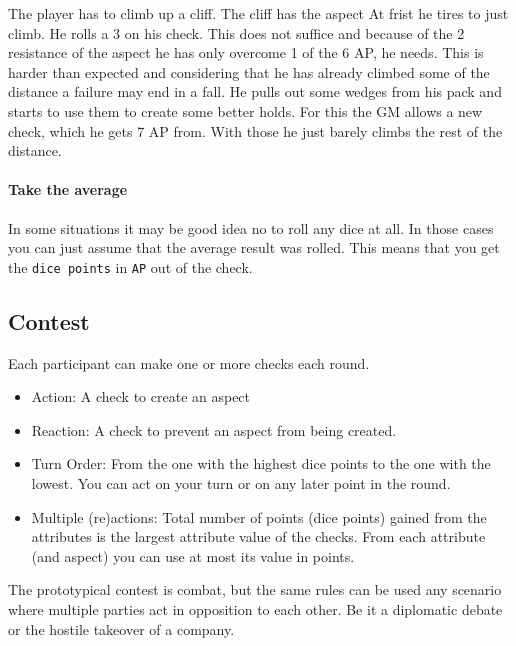 \documentclass[11pt]{article}
\begin{document}
{\begin{pwexample}
The player has to climb up a cliff. The cliff has the aspect  At frist he tires to just climb. He rolls a 3 on his check. This does not suffice and because of the 2 resistance of the aspect he has only overcome 1 of the 6 AP, he needs. This is harder than expected and considering that he has already climbed some of the distance a failure may end in a fall. He pulls out some wedges from his pack and starts to use them to create some better holds. For this the GM allows a new check, which he gets 7 AP from. With those he just barely climbs the rest of the distance.
\end{pwexample}

\paragraph*{Take the average}
\label{sec:orgdbbeacb}
In some situations it may be good idea no to roll any dice at all. In those cases you can just assume that the average result was rolled. This means that you get the \texttt{dice points} in \texttt{AP} out of the check.

\subsection{Contest}
\label{sec:org2b97c96}
\begin{short}
Each participant can make one or more checks each round.
\begin{itemize}
\item Action: A check to create an aspect
\item Reaction: A check to prevent an aspect from being created.
\item Turn Order: From the one with the highest dice points to the one with the lowest. You can act on your turn or on any later point in the round.
\item Multiple (re)actions: Total number of points (dice points) gained from the attributes is the largest attribute value of the checks. From each attribute (and aspect) you can use at most its value in points.
\end{itemize}
\end{short}

The prototypical contest is combat, but the same rules can be used any scenario where multiple parties act in opposition to each other. Be it a diplomatic debate or the hostile takeover of a company. 

}
\end{document}
